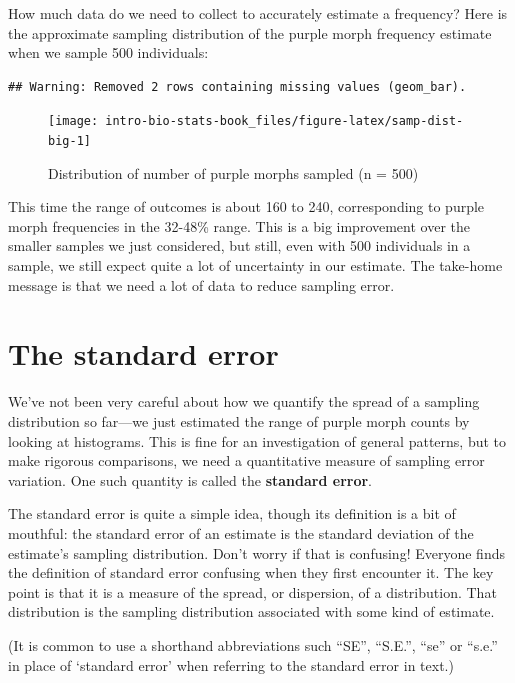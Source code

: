 \documentclass[
]{book}
\begin{document}
How much data do we need to collect to accurately estimate a frequency? Here is the approximate sampling distribution of the purple morph frequency estimate when we sample 500 individuals:

\begin{verbatim}
## Warning: Removed 2 rows containing missing values (geom_bar).
\end{verbatim}

\begin{figure}

{\centering \texttt{[image: intro-bio-stats-book\_files/figure-latex/samp-dist-big-1]} 

}

\caption{Distribution of number of purple morphs sampled (n = 500)}\label{fig:samp-dist-big}
\end{figure}

This time the range of outcomes is about 160 to 240, corresponding to purple morph frequencies in the 32-48\% range. This is a big improvement over the smaller samples we just considered, but still, even with 500 individuals in a sample, we still expect quite a lot of uncertainty in our estimate. The take-home message is that we need a lot of data to reduce sampling error.

\hypertarget{the-standard-error}{%
\section{The standard error}\label{the-standard-error}}

We've not been very careful about how we quantify the spread of a sampling distribution so far---we just estimated the range of purple morph counts by looking at histograms. This is fine for an investigation of general patterns, but to make rigorous comparisons, we need a quantitative measure of sampling error variation. One such quantity is called the \textbf{standard error}.

The standard error is quite a simple idea, though its definition is a bit of mouthful: the standard error of an estimate is the standard deviation of the estimate's sampling distribution. Don't worry if that is confusing! Everyone finds the definition of standard error confusing when they first encounter it. The key point is that it is a measure of the spread, or dispersion, of a distribution. That distribution is the sampling distribution associated with some kind of estimate.

(It is common to use a shorthand abbreviations such ``SE'', ``S.E.'', ``se'' or ``s.e.'' in place of `standard error' when referring to the standard error in text.)
\end{document}
